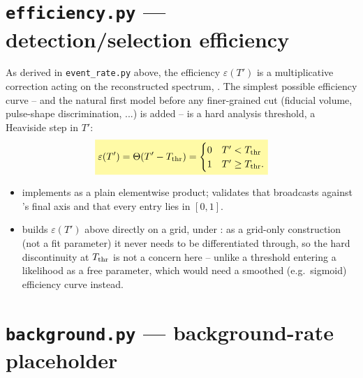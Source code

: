 \section{\texttt{efficiency.py} --- detection/selection efficiency}
\label{sec:detector-efficiency}


\begin{theorybox}
As derived in \texttt{event\_rate.py} above, the efficiency $\varepsilon(T')$
is a multiplicative correction acting on the reconstructed spectrum,
. The simplest possible efficiency curve
-- and the natural first model before any finer-grained cut (fiducial
volume, pulse-shape discrimination, ...) is added -- is a hard analysis
threshold, a Heaviside step in $T'$:
\begin{equation}
  \keyresult{\varepsilon(T') = \Theta(T' - T_{\rm thr})
    = \begin{cases} 0 & T' < T_{\rm thr} \\ 1 & T' \geq T_{\rm thr}. \end{cases}}
\end{equation}
\end{theorybox}

\begin{implbox}
\begin{itemize}
  \item {} implements
     as a plain elementwise product;
    validates that  broadcasts against
    's final axis and that every entry lies in
    $[0,1]$.
  \item {} builds
    $\varepsilon(T')$ above directly on a grid, under
    : as a grid-only construction (not a fit
    parameter) it never needs to be differentiated through, so the hard
    discontinuity at $T_{\rm thr}$ is not a concern here -- unlike a
    threshold entering a likelihood as a free parameter, which would need a
    smoothed (e.g.\ sigmoid) efficiency curve instead.
\end{itemize}
\end{implbox}

\section{\texttt{background.py} --- background-rate placeholder}

